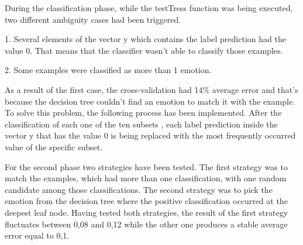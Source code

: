 During the classification phase, while the testTress function was being executed, two different ambiguity cases had been triggered. 

1. Several elements of the vector y which contains the label prediction had the
value 0. That means that the classifier wasn't able to classify those examples.

2. Some examples were classified as more than 1 emotion.

As a result of the first case, the cross-validation had 14\% average error and
that's because the decision tree couldn't find an emotion to match it with the example. To solve this problem, the following process has been implemented. After the classification of each one of the ten subsets , each label prediction inside the vector y  that has the value 0 is being replaced with the most frequently occurred value of the specific subset.

For the second phase two strategies have been tested. The first strategy was to match the examples, which had more than one classification, with one random candidate among those classifications. The second strategy was to pick the emotion from the decision tree where the positive classification occurred at the deepest leaf node. Having tested both strategies, the result of the first strategy fluctuates between 0,08 and 0,12 while the other one produces a stable average error equal to 0,1.
